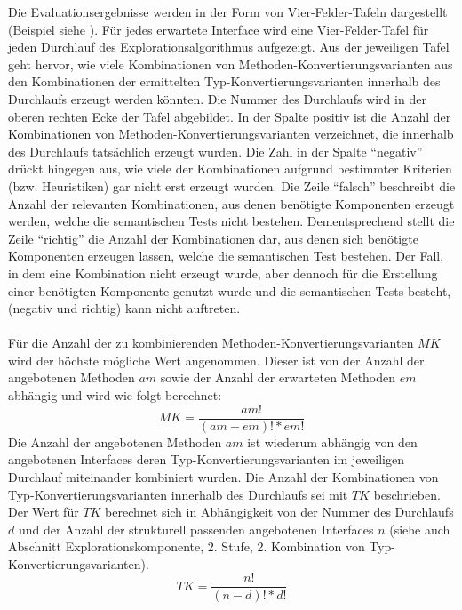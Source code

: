 Die Evaluationsergebnisse werden in der Form von Vier-Felder-Tafeln dargestellt (Beispiel siehe ). Für jedes erwartete Interface wird eine Vier-Felder-Tafel für jeden Durchlauf des Explorationsalgorithmus aufgezeigt. Aus der jeweiligen Tafel geht hervor, wie viele Kombinationen von Methoden-Konvertierungsvarianten aus den Kombinationen der ermittelten Typ-Konvertierungsvarianten innerhalb des Durchlaufs erzeugt werden könnten. Die Nummer des Durchlaufs wird in der oberen rechten Ecke der Tafel abgebildet. In der Spalte positiv ist die Anzahl der Kombinationen von Methoden-Konvertierungsvarianten verzeichnet, die innerhalb des Durchlaufs tatsächlich erzeugt wurden. Die Zahl in der Spalte ``negativ'' drückt hingegen aus, wie viele der Kombinationen aufgrund bestimmter Kriterien (bzw. Heuristiken) gar nicht erst erzeugt wurden.  Die Zeile ``falsch'' beschreibt die Anzahl der relevanten Kombinationen, aus denen benötigte Komponenten erzeugt werden, welche die semantischen Tests nicht bestehen. Dementsprechend stellt die Zeile ``richtig'' die Anzahl der Kombinationen dar, aus denen sich benötigte Komponenten erzeugen lassen, welche die semantischen Test bestehen. Der Fall, in dem eine Kombination nicht erzeugt wurde, aber dennoch für die Erstellung einer benötigten Komponente genutzt wurde und die semantischen Tests besteht, (negativ und richtig) kann nicht auftreten.\\\\
Für die Anzahl der zu kombinierenden Methoden-Konvertierungsvarianten $MK$ wird der höchste mögliche Wert angenommen. Dieser ist von der Anzahl der angebotenen Methoden $am$ sowie der Anzahl der erwarteten Methoden $em$ abhängig und wird wie folgt berechnet: 
\begin{equation*}
MK = \frac{am!}{(am-em)!*em!}
\end{equation*}
\noindent
Die Anzahl der angebotenen Methoden $am$ ist wiederum abhängig von den angebotenen Interfaces deren Typ-Konvertierungsvarianten im jeweiligen Durchlauf miteinander kombiniert wurden. Die Anzahl der Kombinationen von Typ-Konvertierungsvarianten innerhalb des Durchlaufs sei mit $TK$ beschrieben. Der Wert für $TK$ berechnet sich in Abhängigkeit von der Nummer des Durchlaufs $d$ und der Anzahl der strukturell passenden angebotenen Interfaces $n$ (siehe auch Abschnitt Explorationskomponente, 2. Stufe, 2. Kombination von Typ-Konvertierungsvarianten).
\begin{equation*}
TK = \frac{n!}{(n-d)!*d!}
\end{equation*}

